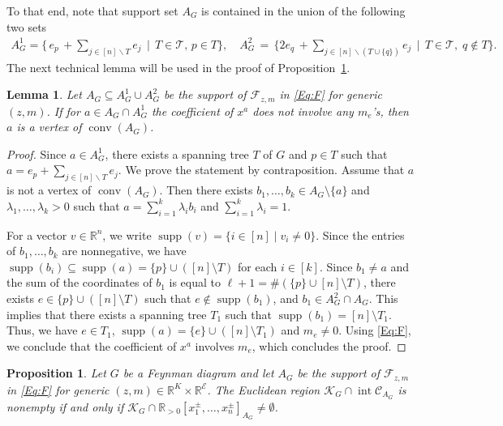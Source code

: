 \documentclass[a4paper,11pt]{amsart}
\newtheorem{proposition}[theorem]{Proposition}
\newtheorem{lemma}[theorem]{Lemma}
\theoremstyle{definition}
\DeclareMathOperator{\interior}{int}
\DeclareMathOperator{\conv}{conv}
\DeclareMathOperator{\supp}{supp}
\newcommand{\RR}{\mathbb{R}}
\begin{document}
To that end, note that support set $A_G$ is contained in the union of the following two sets
\begin{align}
\label{Eq:supportFz}
 A^1_G = \Big\{ \,e_p \,+\!\! \sum_{j\in [n] \backslash T } \!e_j \,\mid \,T \in \mathcal{T} ,\,p \in T \Big\},
\quad 
    A^2_G\, =\, \Big\{ 2e_q \,+\!\!\! \sum_{j\in [n]\backslash (T \cup \{q\})}\!\!\!
    \!\! e_j \,\mid\, T \in \mathcal{T} ,\; q \not\in T \Big\}.
 \end{align}
The next technical lemma will be used in the proof of Proposition~\ref{Prop:IntersectCoposCone}.
\begin{lemma}
\label{Lemma:NotAVertex}
Let $A_G \subseteq A_G^1 \cup A_G^2$ be the support of $\mathcal{F}_{z,m}$ in \eqref{Eq:F} for generic $(z,m)$.
If for $a \in A_G \cap A_G^1$ the coefficient of $x^a$ does not involve any $m_e$'s, then $a$ is a vertex of $\conv(A_G)$.
\end{lemma}

\begin{proof}
Since $a \in A^1_G$, there exists a spanning tree $T$ of $G$ and $p \in T$ such that  $a = e_p +  \sum_{j\in [n] \backslash T } \!e_j$. 
We prove the statement by contraposition.
Assume that $a$ is not a vertex of $\conv(A_G)$. Then there exists $b_1,\dots,b_k \in A_G \setminus \{a\}$ and $\lambda_1,\dots,\lambda_k > 0$ such that $a = \sum_{i=1}^k\lambda_i b_i$ and $\sum_{i=1}^k\lambda_i =1$. 

For a vector $v \in \mathbb{R}^n$, we write $\supp(v) = \{ i \in [n] \mid v_i \neq 0 \}$. Since the entries of $b_1, \dots, b_k$ are nonnegative, we have $\supp(b_i) \subseteq \supp(a) = \{p\}\cup ([n] \setminus T) $ for each $i \in [k]$. 
Since $b_1 \neq a$ and the sum of the coordinates of $b_1$ is equal to $\ell +1 =\# (\{p\} \cup [n]\setminus T)$, there exists $e \in \{p\}\cup ([n] \setminus T)$ such that $e \notin \supp(b_1)$, and $b_1 \in A_{G}^2 \cap A_G$.
This implies that there exists a spanning tree $T_1$ such that $\supp(b_1) = [n] \setminus T_1$.
Thus, we have $e \in T_1$, $\supp(a) = \{e \} \cup ([n] \setminus T_1)$ and $m_e \neq 0$.
Using \eqref{Eq:F}, we conclude that the coefficient of $x^a$ involves $m_{e}$, which concludes the proof.
\end{proof}

\begin{proposition}
\label{Prop:IntersectCoposCone}
Let $G$ be a Feynman diagram and let $A_G$ be the support of $\mathcal{F}_{z,m}$ in \eqref{Eq:F} for generic $(z,m) \in \RR^K \times \RR^{\mathcal{E}}$.
The Euclidean region $\mathcal{K}_G \cap \interior \mathcal{C}_{A_G}$ is nonempty if and only if $\mathcal{K}_G \cap \mathbb{R}_{> 0}[x_1^\pm, \dots,x_n^\pm]_{A_G} \neq  \emptyset$.
\end{proposition}
\end{document}
